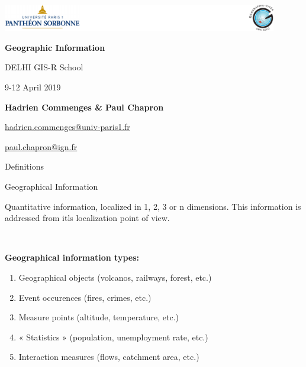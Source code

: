 \graphicspath{{IMAGE/}}

\begin{frame}
\includegraphics[width=12cm]{Logos.pdf}

\vfill

\begin{center}

\vspace*{1.5cm}

\LARGE
\textbf{Geographic Information}

\vspace*{1.5cm}
 DELHI GIS-R School


\large
9-12 April 2019

\vspace*{1.5cm}


\textbf{Hadrien Commenges \& Paul Chapron}

{\small

\vspace*{0.1cm}

\url{hadrien.commenges@univ-paris1.fr}

\url{paul.chapron@ign.fr}

}

\end{center}

\end{frame}


\begin{frame}{Definitions}

\begin{block}{Geographical Information }

Quantitative information, localized in 1, 2, 3 or n dimensions. 
This information is addressed from itls localization point of view.
\end{block}

~

\textbf{Geographical information types:}

\begin{enumerate}
\item Geographical objects (volcanos, railways, forest, etc.)
\item Event occurences (fires, crimes, etc.)
\item Measure points (altitude, temperature, etc.)
\item « Statistics » (population, unemployment rate, etc.)
\item Interaction measures (flows, catchment area, etc.)
\end{enumerate}

\end{frame}



